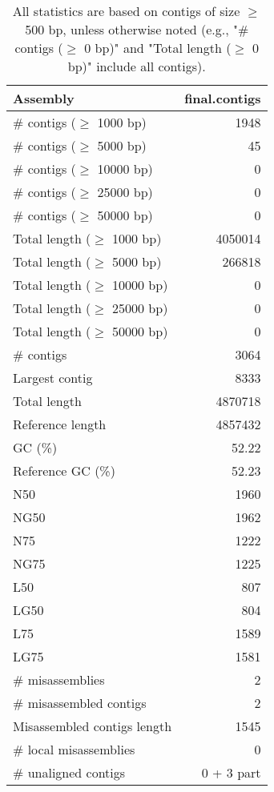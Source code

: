 \documentclass[12pt,a4paper]{article}
\begin{document}
\begin{table}[ht]
\begin{center}
\caption{All statistics are based on contigs of size $\geq$ 500 bp, unless otherwise noted (e.g., "\# contigs ($\geq$ 0 bp)" and "Total length ($\geq$ 0 bp)" include all contigs).}
\begin{tabular}{|l*{1}{|r}|}
\hline
Assembly & final.contigs \\ \hline
\# contigs ($\geq$ 1000 bp) & 1948 \\ \hline
\# contigs ($\geq$ 5000 bp) & 45 \\ \hline
\# contigs ($\geq$ 10000 bp) & 0 \\ \hline
\# contigs ($\geq$ 25000 bp) & 0 \\ \hline
\# contigs ($\geq$ 50000 bp) & 0 \\ \hline
Total length ($\geq$ 1000 bp) & 4050014 \\ \hline
Total length ($\geq$ 5000 bp) & 266818 \\ \hline
Total length ($\geq$ 10000 bp) & 0 \\ \hline
Total length ($\geq$ 25000 bp) & 0 \\ \hline
Total length ($\geq$ 50000 bp) & 0 \\ \hline
\# contigs & 3064 \\ \hline
Largest contig & 8333 \\ \hline
Total length & 4870718 \\ \hline
Reference length & 4857432 \\ \hline
GC (\%) & 52.22 \\ \hline
Reference GC (\%) & 52.23 \\ \hline
N50 & 1960 \\ \hline
NG50 & 1962 \\ \hline
N75 & 1222 \\ \hline
NG75 & 1225 \\ \hline
L50 & 807 \\ \hline
LG50 & 804 \\ \hline
L75 & 1589 \\ \hline
LG75 & 1581 \\ \hline
\# misassemblies & 2 \\ \hline
\# misassembled contigs & 2 \\ \hline
Misassembled contigs length & 1545 \\ \hline
\# local misassemblies & 0 \\ \hline
\# unaligned contigs & 0 + 3 part \\ \hline

\end{tabular}
\end{center}
\end{table}
\end{document}
